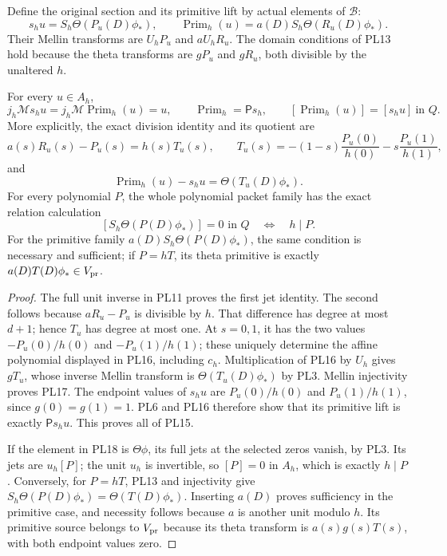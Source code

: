 Define the original section and its primitive lift by actual elements
of \(\mathscr B\):
\[
 s_hu=S_h\Theta(P_u(D)\phi_*),\qquad
 \operatorname{Prim}_h(u)=a(D)S_h\Theta(R_u(D)\phi_*).
 \tag{PL14}\label{pl:pl:lift}
\]
Their Mellin transforms are \(U_hP_u\) and \(aU_hR_u\).
The domain conditions of PL13 hold because the theta transforms are
\(gP_u\) and \(gR_u\), both divisible by the unaltered \(h\).

\begin{theorem}
\label{pl:thm:primitive}
For every \(u\in A_h\),
\[
 j_h\mathcal M s_hu=j_h\mathcal M\operatorname{Prim}_h(u)=u,\qquad
 \operatorname{Prim}_h=\mathsf P s_h,\qquad
 [\operatorname{Prim}_h(u)]=[s_hu]\ \text{in }Q.
 \tag{PL15}\label{pl:pl:sameclass}
\]
More explicitly, the exact division identity and its quotient are
\[
 a(s)R_u(s)-P_u(s)=h(s)T_u(s),\qquad
 T_u(s)=-(1-s)\frac{P_u(0)}{h(0)}-s\frac{P_u(1)}{h(1)},
 \tag{PL16}\label{pl:pl:affine}
\]
and
\[
 \operatorname{Prim}_h(u)-s_hu=\Theta(T_u(D)\phi_*).
 \tag{PL17}\label{pl:pl:exactrelation}
\]
For every polynomial \(P\), the whole polynomial packet family has
the exact relation calculation
\[
 [S_h\Theta(P(D)\phi_*)]=0\text{ in }Q
       \quad\Longleftrightarrow\quad h\mid P.
 \tag{PL18}\label{pl:pl:allrelations}
\]
For the primitive family \(a(D)S_h\Theta(P(D)\phi_*)\), the same
condition is necessary and sufficient; if \(P=hT\), its theta
primitive is exactly \(a(D)T(D)\phi_*\in V_{\rm pr}\).
\end{theorem}
\begin{proof}
The full unit inverse in PL11 proves the first jet identity.
The second follows because \(aR_u-P_u\) is divisible by \(h\).
That difference has degree at most \(d+1\); hence \(T_u\) has degree
at most one. At \(s=0,1\), it has the two values
\(-P_u(0)/h(0)\) and \(-P_u(1)/h(1)\); these uniquely determine
the affine polynomial displayed in PL16, including \(c_h\).
Multiplication of PL16 by \(U_h\) gives \(gT_u\), whose inverse
Mellin transform is \(\Theta(T_u(D)\phi_*)\) by PL3. Mellin
injectivity proves PL17.
The endpoint values of \(s_hu\) are \(P_u(0)/h(0)\) and
\(P_u(1)/h(1)\), since \(g(0)=g(1)=1\).
PL6 and PL16 therefore show that its primitive lift is exactly
\(\mathsf P s_hu\). This proves all of PL15.

If the element in PL18 is \(\Theta\phi\), its full jets at the
selected zeros vanish, by PL3. Its jets are \(u_h[P]\);
the unit \(u_h\) is invertible, so \([P]=0\) in \(A_h\), which is
exactly \(h\mid P\). Conversely, for \(P=hT\), PL13 and injectivity
give \(S_h\Theta(P(D)\phi_*)=\Theta(T(D)\phi_*)\).
Inserting \(a(D)\) proves sufficiency in the primitive case, and
necessity follows because \(a\) is another unit modulo \(h\).
Its primitive source belongs to \(V_{\rm pr}\) because its theta
transform is \(a(s)g(s)T(s)\), with both endpoint values zero.
\end{proof}

